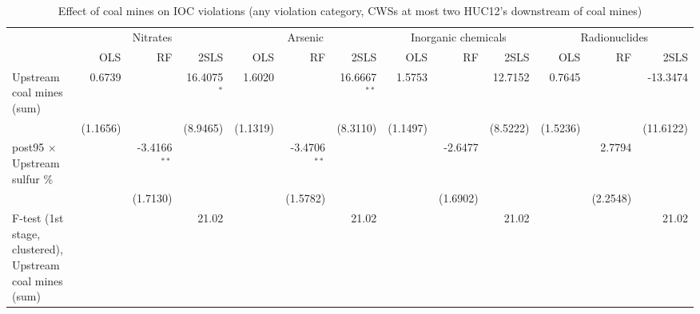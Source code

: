 
\begin{table}[htbp]
   
   \caption{\label{2sls_dwnstrm2step_minevio_allcat_ivsum} Effect of coal mines on IOC violations (any violation category, CWSs at most two HUC12's downstream of coal mines)}
   \bigskip
   
   \centering
   
   \begin{adjustbox}{width = \textwidth, center}
      
      
      \begin{tabular}{lrrrrrrrrrrrr}
         \toprule
         
          & \multicolumn{3}{c}{Nitrates} & \multicolumn{3}{c}{Arsenic} & \multicolumn{3}{c}{Inorganic chemicals} & \multicolumn{3}{c}{Radionuclides}\\
         
                                                                  & OLS      & RF             & 2SLS          & OLS      & RF             & 2SLS           & OLS      & RF       & 2SLS     & OLS      & RF       & 2SLS\\  
         
         \midrule 
         Upstream coal mines (sum)                                & 0.6739   &                & 16.4075$^{*}$ & 1.6020   &                & 16.6667$^{**}$ & 1.5753   &          & 12.7152  & 0.7645   &          & -13.3474\\   
                                                                  & (1.1656) &                & (8.9465)      & (1.1319) &                & (8.3110)       & (1.1497) &          & (8.5222) & (1.5236) &          & (11.6122)\\   
         post95 $\times$ Upstream sulfur \%                       &          & -3.4166$^{**}$ &               &          & -3.4706$^{**}$ &                &          & -2.6477  &          &          & 2.7794   &   \\   
                                                                  &          & (1.7130)       &               &          & (1.5782)       &                &          & (1.6902) &          &          & (2.2548) &   \\   
         
         F-test (1st stage, clustered), Upstream coal mines (sum) &          &                & 21.02         &          &                & 21.02          &          &          & 21.02    &          &          & 21.02\\  
         

\end{tabular}
\end{adjustbox}
\end{table}
